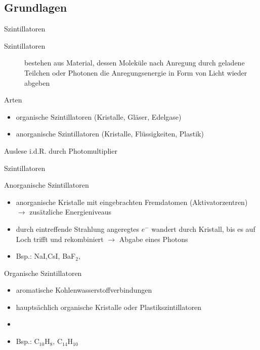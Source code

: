 \subsection[]{Grundlagen}

\begin{frame}{Szintillatoren}

\begin{description}
	  \item[Szintillatoren] bestehen aus Material, dessen Moleküle nach Anregung durch geladene
	  Teilchen oder Photonen die Anregungsenergie in Form von Licht wieder abgeben
	\end{description}
	\begin{block}{Arten}
		\begin{itemize}
		  \item organische Szintillatoren (Kristalle, Gläser, Edelgase)
		  \item anorganische Szintillatoren (Kristalle, Flüssigkeiten, Plastik)
		\end{itemize}
	\end{block}
	\vspace{0.7cm}
	Auslese i.d.R. durch Photomultiplier
\end{frame}	


\begin{frame}{Szintillatoren}
	\begin{block}{Anorganische Szintillatoren}
		\begin{itemize}
		  \item anorganische Kristalle mit eingebrachten Fremdatomen (Aktivatorzentren) $\rightarrow$
		  zusätzliche Energieniveaus
		  \item durch eintreffende Strahlung angeregtes $e^-$ wandert durch Kristall, bis es auf Loch
		  trifft und rekombiniert $\rightarrow$ Abgabe eines Photons
		  \item Bsp.: NaI,CsI, BaF$_2$,
		\end{itemize}
	\end{block}
		\begin{block}{Organische Szintillatoren}
		\begin{itemize}
		  \item aromatische Kohlenwasserstoffverbindungen
		  \item hauptsächlich organische Kristalle oder Plastikszintillatoren
		  \item 
		  \item Bsp.: C$_{10}$H$_8$, C$_{14}$H$_{10}$
		\end{itemize}
	\end{block}
\end{frame}	

